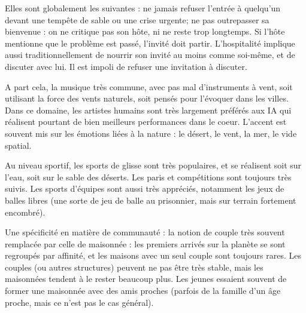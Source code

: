 \documentclass[10pt,a4paper]{book}
\begin{document}
\begin{multicols}{2}
Elles sont globalement les suivantes : ne jamais refuser l'entrée à quelqu'un devant une tempête de sable ou une crise urgente; ne pas outrepasser sa bienvenue : on ne critique pas son hôte, ni ne reste trop longtemps. Si l'hôte mentionne que le problème est passé, l'invité doit partir. L'hospitalité implique aussi traditionnellement de nourrir son invité au moins comme soi-même, et de discuter avec lui. Il est impoli de refuser une invitation à discuter.

A part cela, la musique très commune, avec pas mal d'instruments à vent, soit utilisant la force des vents naturels, soit pensés pour l'évoquer dans les villes. Dans ce domaine, les artistes humains sont très largement préférés aux IA qui réalisent pourtant de bien meilleurs performances dans le coeur. L'accent est souvent mis sur les émotions liées à la nature : le désert, le vent, la mer, le vide spatial.

Au niveau sportif, les sports de glisse sont très populaires, et se réalisent soit sur l'eau, soit sur le sable des déserts. Les paris et compétitions sont toujours très suivis. Les sports d'équipes sont aussi très appréciés, notamment les jeux de balles libres (une sorte de jeu de balle au prisonnier, mais sur terrain fortement encombré).

Une spécificité en matière de communauté : la notion de couple très souvent remplacée par celle de maisonnée : les premiers arrivés sur la planète se sont regroupés par affinité, et les maisons avec un seul couple sont toujours rares. Les couples (ou autres structures) peuvent ne pas être très stable, mais les maisonnées tendent à le rester beaucoup plus. Les jeunes essaient souvent de former une maisonnée avec des amis proches (parfois de la famille d'un âge proche, mais ce n'est pas le cas général).

\end{multicols}
\end{document}
